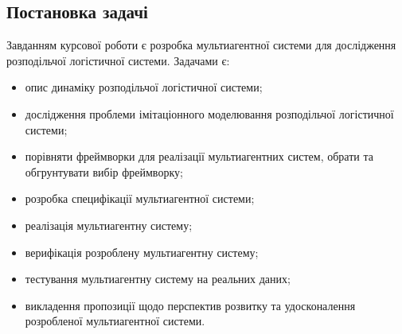 \subsection{Постановка задачі}
Завданням курсової роботи є розробка мультиагентної системи для дослідження розподільчої логістичної системи.
Задачами є:
\begin{itemize}
	\item опис динаміку розподільчої логістичної системи;
	\item дослідження проблеми імітаціонного моделювання розподільчої логістичної системи;
	\item порівняти фреймворки для реалізації мультиагентних систем, обрати та обгрунтувати вибір фреймворку;
	\item розробка специфікації мультиагентної системи;
	\item реалізація мультиагентну систему;
	\item верифікація розроблену мультиагентну систему;
	\item тестування мультиагентну систему на реальних даних;
	\item викладення пропозиції щодо перспектив розвитку та удосконалення розробленої мультиагентної системи.
\end{itemize}
